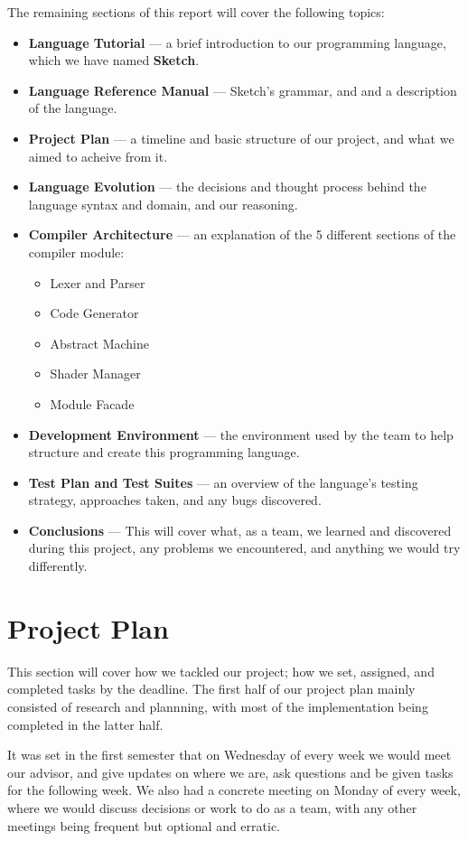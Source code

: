 \documentclass{l3proj}
\begin{document}
The remaining sections of this report will cover the following topics:
\begin{itemize}
	\item \textbf{Language Tutorial} --- a brief introduction to our programming language, which we have named \textbf{Sketch}.
	\item \textbf{Language Reference Manual} --- Sketch's grammar, and and a description of the language.
	\item \textbf{Project Plan} --- a timeline and basic structure of our project, and what we aimed to acheive from it.
	\item \textbf{Language Evolution} --- the decisions and thought process behind the language syntax and domain, and our reasoning.
	\item \textbf{Compiler Architecture} --- an explanation of the 5 different sections of the compiler module:
	\begin{itemize}
		\item Lexer and Parser
		\item Code Generator
		\item Abstract Machine
		\item Shader Manager
		\item Module Facade
	\end{itemize}
	\item \textbf{Development Environment} --- the environment used by the team to help structure and create this programming language.
	\item \textbf{Test Plan and Test Suites} --- an overview of the language's testing strategy, approaches taken, and any bugs discovered.
	\item \textbf{Conclusions} --- This will cover what, as a team, we learned and discovered during this project, any problems we encountered, and anything we would try differently.
\end{itemize}


\chapter{Project Plan}
\label{plan}
This section will cover how we tackled our project; how we set, assigned, and completed tasks by the deadline. The first half of our project plan mainly consisted of research and plannning, with most of the implementation being completed in the latter half.

It was set in the first semester that on Wednesday of every week we would meet our advisor, and give updates on where we are, ask questions and be given tasks for the following week. We also had a concrete meeting on Monday of every week, where we would discuss decisions or work to do as a team, with any other meetings being frequent but optional and erratic.
\end{document}
